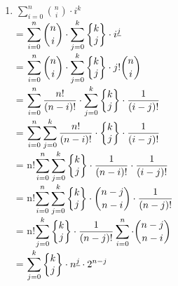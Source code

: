 \begin{enumerate}
\begin{enumerate}
      \item For non-negative integers $m$ and $n$ and a prime $\displaystyle p$, the following congruence relation holds:
      \(\displaystyle \left(\frac{m}{n}\right) \equiv \prod_{i=0}^{k} \left(\frac{m_{i}}{n_{i}}\right) (\text{mod}\; p),\)
      where,
      $m=m_{k} p^{k} +m_{k-1} p^{k-1}+\dots+m_{1} p+m_{0}$,
      and
      $n=n_{k}p^{k}+n_{k-1}p^{k-1}+\dots+n_{1}p+n_{0}$
      are the base $\displaystyle p$ expansions of $m$ and $n$ respectively. This uses the convention that $\displaystyle \left(\frac{m}{n}\right)=0$,when $m<n$.
    \end{enumerate}
    \item $\displaystyle \sum_{i=0}^{n}  {n \choose i } \cdot i^{k}$
    \\= $\displaystyle \sum_{i=0}^{n}  {n \choose i } \cdot \sum_{j=0}^{k}{ \left\{ \begin{matrix} k\cr j \end{matrix} \right\} \cdot i^{\underline{j}}}$
    \\= $\displaystyle \sum_{i=0}^{n} {n \choose i } \cdot \sum_{j=0}^{k} \left\{ \begin{matrix} k\cr j \end{matrix} \right\} \cdot  j! {n \choose i }$
    \\= $\displaystyle \sum_{i=0}^{n} \frac{n!}{(n-i)!} \cdot \sum_{j=0}^{k} \left\{ \begin{matrix}k\cr j \end{matrix} \right\} \cdot \frac{1}{(i-j)!}$
    \\= $\displaystyle \sum_{i=0}^{n} \sum_{j=0}^{k} \frac{n!}{(n-i)!} \cdot  \left\{\begin{matrix} k\cr j \end{matrix} \right\} \cdot \frac{1}{(i-j)!}$
    \\= n!$\displaystyle \sum_{i=0}^{n} \sum_{j=0}^{k} \left\{ \begin{matrix} k\cr j \end{matrix} \right\} \cdot \frac{1}{(n-i)!} \cdot \frac{1}{(i-j)!}$
    \\= n!$\displaystyle \sum_{i=0}^{n} \sum_{j=0}^{k} \left\{ \begin{matrix} k\cr j \end{matrix} \right\} \cdot { n-j \choose n-i} \cdot \frac{1}{(n-j)!}$
    \\= n!$\displaystyle \sum_{j=0}^{k} \left\{ \begin{matrix} k\cr j \end{matrix} \right\} \cdot \frac{1}{(n-j)!} \sum_{i=0}^{n} \cdot { n-j \choose n-i}$
    \\= $\displaystyle \sum_{j=0}^{k} \left\{\begin{matrix} k\cr j \end{matrix} \right\} \cdot n^{\underline{j}} \cdot 2^{n-j}$


\end{enumerate}
